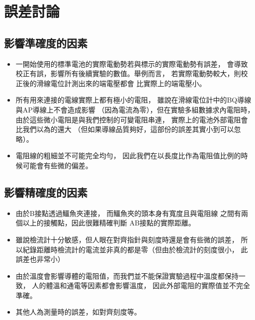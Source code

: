 \documentclass[12pt]{article}
\begin{document}
    \section{誤差討論}

        \subsection{影響準確度的因素}
            \begin{itemize}
                \item 一開始使用的標準電池的實際電動勢若與標示的實際電動勢有誤差，
                    會導致校正有誤，影響所有後續實驗的數值。舉例而言，
                    若實際電動勢較大，則校正後的滑線電位計測出來的端電壓都會
                    比實際上的端電壓小。
                \item 所有用來連接的電線實際上都有極小的電阻，
                    雖說在滑線電位計中的BQ導線與AP導線上不會造成影響
                    （因為電流為零），但在實驗多組數據求內電阻時，
                    由於這些微小電阻是與我們控制的可變電阻串連，
                    實際上的電池外部電阻會比我們以為的還大
                    （但如果導線品質夠好，這部份的誤差其實小到可以忽略）。
                \item 電阻線的粗細並不可能完全均勻，
                    因此我們在以長度比作為電阻值比例的時候可能會有些微的偏差。
            \end{itemize}
        \subsection{影響精確度的因素}
            \begin{itemize}
                \item 由於B接點透過鱷魚夾連接，­
                    而鱷魚夾的頭本身有寬度且與電阻線
                    之間有兩個以上的接觸點，因此很難精確判斷
                    AB接點的實際距離。
                \item 雖說檢流計十分敏感，但人眼在對齊指針與刻度時還是會有些微的誤差，
                    所以紀錄距離時檢流計的電流並非真的都是零（但由於檢流計的刻度很小，
                    此誤差也非常小）
                \item 由於溫度會影響導體的電阻值，而我們並不能保證實驗過程中溫度都保持一致，
                    人的體溫和通電等因素都會影響溫度，
                    因此外部電阻的實際值並不完全準確。
                \item 其他人為測量時的誤差，如對齊刻度等。
            \end{itemize}
\end{document}
